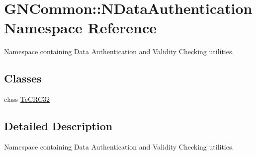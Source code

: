 \hypertarget{namespace_g_n_common_1_1_n_data_authentication}{}\section{G\+N\+Common\+:\+:N\+Data\+Authentication Namespace Reference}
\label{namespace_g_n_common_1_1_n_data_authentication}


Namespace containing Data Authentication and Validity Checking utilities.  


\subsection*{Classes}
\begin{DoxyCompactItemize}
\item 
class \mbox{\hyperlink{class_g_n_common_1_1_n_data_authentication_1_1_tc_c_r_c32}{Tc\+C\+R\+C32}}
\end{DoxyCompactItemize}


\subsection{Detailed Description}
Namespace containing Data Authentication and Validity Checking utilities. 